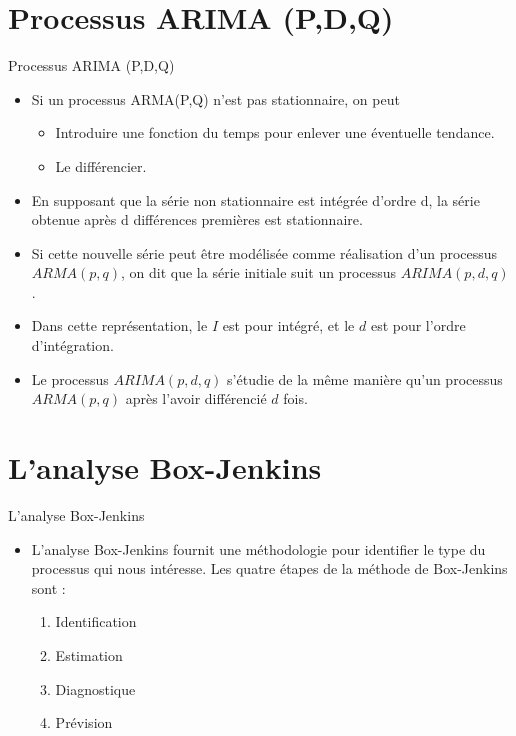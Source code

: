 \documentclass{beamer}
\begin{document}
\section{Processus ARIMA (P,D,Q)}
\frame{\tableofcontents[current]}
\begin{frame}{Processus ARIMA (P,D,Q)}
\begin{itemize}
\item Si un processus ARMA(P,Q) n’est pas stationnaire, on peut
\begin{itemize}
\item Introduire une fonction du temps pour enlever une éventuelle tendance.
\item Le différencier.
\end{itemize}
\item En supposant que la série non stationnaire est intégrée d’ordre d, la série obtenue après d différences premières est stationnaire.
\item Si cette nouvelle série peut être modélisée comme réalisation d’un processus $ARMA(p,q)$, on dit que la série initiale suit un processus $ARIMA(p, d, q)$.
\item Dans cette représentation, le $I$ est pour intégré, et le $d$ est pour l’ordre d’intégration.
\item Le processus $ARIMA(p,d,q)$ s’étudie de la même manière qu’un processus $ARMA(p,q)$ après l’avoir différencié $d$ fois.
\end{itemize}
\end{frame}

\section{L’analyse Box-Jenkins}
\frame{\tableofcontents[current]}
\begin{frame}{L’analyse Box-Jenkins}
\begin{itemize}
\item L’analyse Box-Jenkins fournit une méthodologie pour identifier le type du processus qui nous intéresse. Les quatre étapes de la méthode de Box-Jenkins sont :
\begin{enumerate}
\item Identification 
\item Estimation 
\item Diagnostique 
\item Prévision
\end{enumerate}
\end{itemize}
\end{frame}
\end{document}
